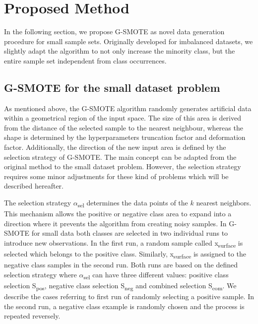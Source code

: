 \documentclass[parskip=full]{scrartcl}
\begin{document}
\section{Proposed Method}

In the following section, we propose G-SMOTE as novel data generation procedure 
for small sample sets. Originally developed for imbalanced datasets, we 
slightly adapt the algorithm to not only increase the minority class, but the 
entire sample set independent from class occurrences. 

\subsection{G-SMOTE for the small dataset problem}

As mentioned above, the G-SMOTE algorithm randomly generates artificial data 
within a geometrical region of the input space. The size of this area is 
derived from the distance of the selected sample to the nearest neighbour, 
whereas the shape is determined by the hyperparameters truncation factor and 
deformation factor. Additionally, the direction of the new input area is 
defined by the selection strategy of G-SMOTE. The main concept can be adapted 
from the original method to the small dataset problem. However, the selection 
strategy requires some minor adjustments for these kind of problems which will 
be described hereafter.

The selection strategy $\alpha$\textsubscript{sel} determines the data points 
of the $\mathit{k}$ nearest neighbors. This mechanism allows the positive or 
negative class area to expand into a direction where it prevents the algorithm 
from creating noisy samples. In G-SMOTE for small data both classes are 
selected in two individual runs to introduce new observations. In the first 
run, a random sample called x\textsubscript{surface} is selected which belongs 
to the positive class. Similarly, x\textsubscript{surface} is assigned to the 
negative class samples in the second run. Both runs are based on the defined 
selection strategy where $\alpha$\textsubscript{sel} can have three different 
values: positive class selection S\textsubscript{pos}, negative class selection 
S\textsubscript{neg} and combined selection S\textsubscript{com}. We describe 
the cases referring to first run of randomly selecting a positive sample. In 
the second run, a negative class example is randomly chosen and the process is 
repeated reversely. 
\end{document}
